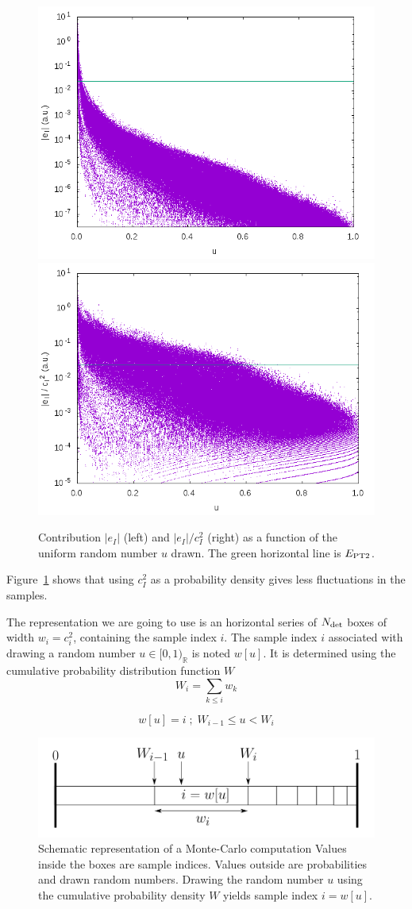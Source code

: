 \documentclass[./thesis.tex]{subfiles}
\begin{document}
\begin{figure}[h!]
	\begin{center}
		\includegraphics[width=0.49\columnwidth]{figures/pt2/eI}
		\includegraphics[width=0.49\columnwidth]{figures/pt2/eici2}
	\end{center}
		\caption{Contribution $|e_I|$ (left) and $|e_I|/c_I^2$ (right) as a function of the uniform random number $u$ drawn. The green horizontal line is $E_\text{PT2}$.}
		\label{fig:ei}
\end{figure}
Figure~\ref{fig:ei} shows that using $c_I^2$ as a probability density gives less
fluctuations in the samples.

The representation we are going to use is an horizontal series of ${N_\text{det}}$ boxes of width $w_i = c_i^2$, containing the sample index $i$.
The sample index $i$ associated with drawing a random number $u \in [0,1)_\mathbb{R}$ is noted $w[u]$. It is determined using the cumulative probability distribution function $W$
\begin{equation}
W_i = \sum_{k \leq i} w_k
\end{equation}

\begin{equation}
w[u] = i \; ; \; W_{i-1} \leq u < W_i
\end{equation}


\begin{figure}[h!]
	\begin{center}
		\includegraphics[width=0.7\columnwidth]{figures/pt2/mc_representation}
	\end{center}
	\caption{Schematic representation of a Monte-Carlo computation
Values inside the boxes are sample indices. Values outside are probabilities and drawn random numbers.
Drawing the random number $u$ using the cumulative probability density $W$ yields sample index $i=w[u]$.}
	\label{fig:mc_representation}
\end{figure}
\end{document}
